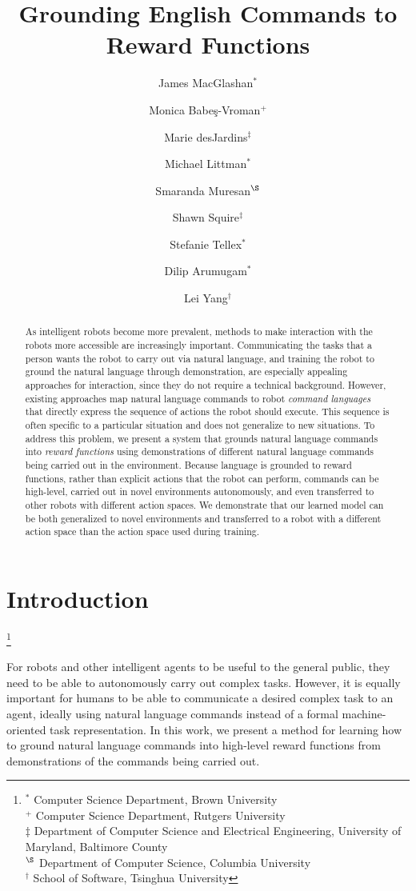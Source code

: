 \documentclass[conference]{IEEEtran}
\title{Grounding English Commands to Reward Functions}
\author{James MacGlashan$^*$
\and Monica Babe\c{s}-Vroman$^+$
\and Marie desJardins$^{\ddagger}$
\and Michael Littman$^*$
\and Smaranda Muresan$^{\S}$ 
\and Shawn Squire$^{\ddagger}$
\and Stefanie Tellex$^*$
\and Dilip Arumugam$^*$
\and Lei Yang$^\dagger$
}
\newcommand\blfootnote[1]{%
  \begingroup
  \renewcommand\thefootnote{}\footnote{#1}%
  \addtocounter{footnote}{-1}%
  \endgroup
}
\begin{document}
\maketitle

\begin{abstract}
As intelligent robots become more prevalent, methods to make
interaction with the robots more accessible are increasingly
important. Communicating the tasks that a person wants the robot to
carry out via natural language, and training the robot to ground the
natural language through demonstration, are especially appealing
approaches for interaction, since they do not require a technical
background.  However, existing approaches map natural language commands
to robot {\em command languages} that directly express the sequence of
actions the robot should execute.  This sequence is often specific to
a particular situation and does not generalize to new situations.  To
address this problem, we present a system that grounds natural
language commands into {\em reward functions} using demonstrations of
different natural language commands being carried out in the
environment.  Because language is grounded to reward functions, rather
than explicit actions that the robot can perform, commands can be
high-level, carried out in novel environments autonomously, and even
transferred to other robots with different action spaces. We
demonstrate that our learned model can be both generalized to novel
environments and transferred to a robot with a different action
space than the action space used during training.
\end{abstract}

\IEEEpeerreviewmaketitle

\section{Introduction}
\blfootnote{$^*$ Computer Science Department, Brown University\\
$^+$ Computer Science Department, Rutgers University\\
$\ddagger$ Department of Computer Science and Electrical Engineering, University of Maryland, Baltimore County\\
$^{\S}$ Department of Computer Science, Columbia University\\
$^\dagger$ School of Software, Tsinghua University
}
For robots and other intelligent agents to be useful to the general
public, they need to be able to autonomously carry out complex
tasks. However, it is equally important for humans to be able to
communicate a desired complex task to an agent, ideally using natural
language commands instead of a formal machine-oriented task
representation. In this work, we present a method for learning
how to ground natural language commands into high-level reward functions
from demonstrations of the commands being carried out.
\end{document}
